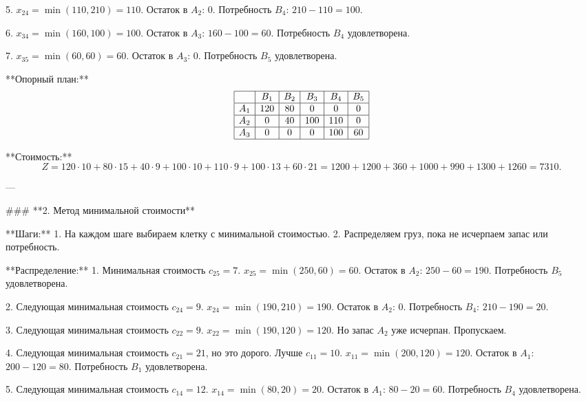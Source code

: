 5. \( x_{24} = \min(110, 210) = 110 \).  
   Остаток в \( A_2 \): 0.  
   Потребность \( B_4 \): \( 210 - 110 = 100 \).  

6. \( x_{34} = \min(160, 100) = 100 \).  
   Остаток в \( A_3 \): \( 160 - 100 = 60 \).  
   Потребность \( B_4 \) удовлетворена.  

7. \( x_{35} = \min(60, 60) = 60 \).  
   Остаток в \( A_3 \): 0.  
   Потребность \( B_5 \) удовлетворена.  

**Опорный план:**  
\[
\begin{array}{|c|c|c|c|c|c|}
\hline
 & B_1 & B_2 & B_3 & B_4 & B_5 \\
\hline
A_1 & 120 & 80 & 0 & 0 & 0 \\
\hline
A_2 & 0 & 40 & 100 & 110 & 0 \\
\hline
A_3 & 0 & 0 & 0 & 100 & 60 \\
\hline
\end{array}
\]

**Стоимость:**  
\[
Z = 120 \cdot 10 + 80 \cdot 15 + 40 \cdot 9 + 100 \cdot 10 + 110 \cdot 9 + 100 \cdot 13 + 60 \cdot 21 = 1200 + 1200 + 360 + 1000 + 990 + 1300 + 1260 = 7310.
\]

---

### **2. Метод минимальной стоимости**

**Шаги:**  
1. На каждом шаге выбираем клетку с минимальной стоимостью.  
2. Распределяем груз, пока не исчерпаем запас или потребность.  

**Распределение:**  
1. Минимальная стоимость \( c_{25} = 7 \).  
   \( x_{25} = \min(250, 60) = 60 \).  
   Остаток в \( A_2 \): \( 250 - 60 = 190 \).  
   Потребность \( B_5 \) удовлетворена.  

2. Следующая минимальная стоимость \( c_{24} = 9 \).  
   \( x_{24} = \min(190, 210) = 190 \).  
   Остаток в \( A_2 \): 0.  
   Потребность \( B_4 \): \( 210 - 190 = 20 \).  

3. Следующая минимальная стоимость \( c_{22} = 9 \).  
   \( x_{22} = \min(190, 120) = 120 \).  
   Но запас \( A_2 \) уже исчерпан. Пропускаем.  

4. Следующая минимальная стоимость \( c_{21} = 21 \), но это дорого.  
   Лучше \( c_{11} = 10 \).  
   \( x_{11} = \min(200, 120) = 120 \).  
   Остаток в \( A_1 \): \( 200 - 120 = 80 \).  
   Потребность \( B_1 \) удовлетворена.  

5. Следующая минимальная стоимость \( c_{14} = 12 \).  
   \( x_{14} = \min(80, 20) = 20 \).  
   Остаток в \( A_1 \): \( 80 - 20 = 60 \).  
   Потребность \( B_4 \) удовлетворена.  

